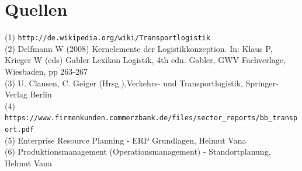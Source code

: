 \documentclass[a4paper,12pt]{scrreprt}
\begin{document}
	
\chapter{Quellen} 
(1) \nolinkurl{http://de.wikipedia.org/wiki/Transportlogistik}\\
(2) Delfmann W (2008) Kernelemente der Logistikkonzeption. In: Klaus P, Krieger W (eds) Gabler
Lexikon Logistik, 4th edn. Gabler, GWV Fachverlage, Wiesbaden, pp 263-267\\
(3) U. Clausen, C. Geiger (Hrsg.),Verkehrs- und Transportlogistik, Springer-Verlag Berlin\\
(4) \nolinkurl{https://www.firmenkunden.commerzbank.de/files/sector_reports/bb_transport.pdf}\\
(5) Enterprise Resource Planning - ERP Grundlagen, Helmut Vana\\
(6) Produktionsmanagement (Operationsmanagement) - Standortplanung, Helmut Vana
\end{document}
